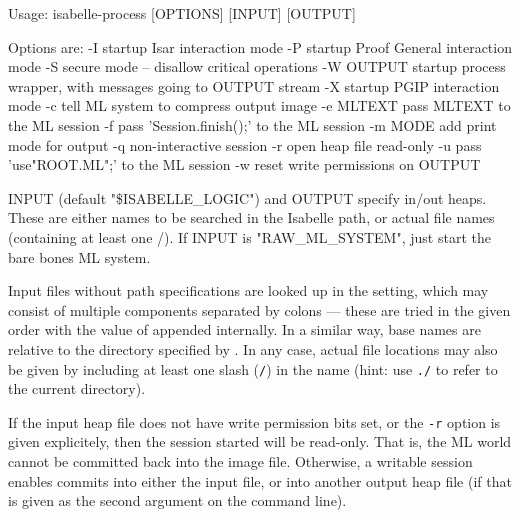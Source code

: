 \begin{isabellebody}
\begin{isamarkuptext}
\begin{ttbox}
Usage: isabelle-process [OPTIONS] [INPUT] [OUTPUT]

  Options are:
    -I           startup Isar interaction mode
    -P           startup Proof General interaction mode
    -S           secure mode -- disallow critical operations
    -W OUTPUT    startup process wrapper, with messages going to OUTPUT stream
    -X           startup PGIP interaction mode
    -c           tell ML system to compress output image
    -e MLTEXT    pass MLTEXT to the ML session
    -f           pass 'Session.finish();' to the ML session
    -m MODE      add print mode for output
    -q           non-interactive session
    -r           open heap file read-only
    -u           pass 'use"ROOT.ML";' to the ML session
    -w           reset write permissions on OUTPUT

  INPUT (default "\$ISABELLE_LOGIC") and OUTPUT specify in/out heaps.
  These are either names to be searched in the Isabelle path, or
  actual file names (containing at least one /).
  If INPUT is "RAW_ML_SYSTEM", just start the bare bones ML system.
\end{ttbox}

  Input files without path specifications are looked up in the
  \hyperlink{setting.ISABELLE-PATH}{\mbox{}} setting, which may consist of multiple
  components separated by colons --- these are tried in the given
  order with the value of \hyperlink{setting.ML-IDENTIFIER}{\mbox{}} appended
  internally.  In a similar way, base names are relative to the
  directory specified by \hyperlink{setting.ISABELLE-OUTPUT}{\mbox{}}.  In any case,
  actual file locations may also be given by including at least one
  slash (\verb|/|) in the name (hint: use \verb|./| to
  refer to the current directory).%
\end{isamarkuptext}%
\isamarkuptrue%
%
\isamarkuptrue%
%
\begin{isamarkuptext}%
If the input heap file does not have write permission bits set, or
  the \verb|-r| option is given explicitely, then the session
  started will be read-only.  That is, the ML world cannot be
  committed back into the image file.  Otherwise, a writable session
  enables commits into either the input file, or into another output
  heap file (if that is given as the second argument on the command
  line).


\end{isamarkuptext}
\end{isabellebody}
